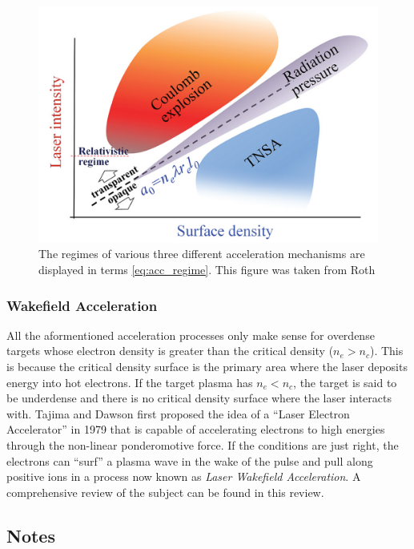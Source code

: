 \begin{figure}
	\centering 
	\includegraphics[width=\linewidth]{planning/images/acceleration_regimes.PNG}
	\caption{The regimes of various three different acceleration mechanisms are displayed in terms \cref{eq:acc_regime}. This figure was taken from Roth\cite{Lezhnin_2015_PoP}}
	\label{fig:regimes}
\end{figure}

\subsubsection{Wakefield Acceleration}
All the aformentioned acceleration processes only make sense for overdense targets whose electron density is greater than the critical density ($n_e > n_c$). This is because the critical density surface is the primary area where the laser deposits energy into hot electrons. If the target plasma has $n_e < n_c$, the target is said to be underdense and there is no critical density surface where the laser interacts with. Tajima and Dawson\cite{Tajima_1979_PRL} first proposed the idea of a ``Laser Electron Accelerator'' in 1979 that is capable of accelerating electrons to high energies through the non-linear ponderomotive force. If the conditions are just right, the electrons can ``surf'' a plasma wave in the wake of the pulse and pull along positive ions in a process now known as \emph{Laser Wakefield Acceleration}. A comprehensive review of the subject can be found in this review\cite{Esarey_2009_LPA}.

\subsection{Notes}

